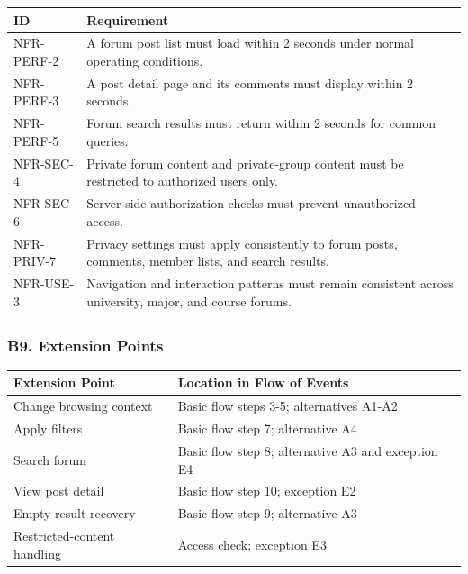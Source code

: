 \documentclass[12pt]{article}
\renewcommand{\baselinestretch}{1.5}
\begin{document}
\begingroup
\small
\renewcommand{\baselinestretch}{1.0}\selectfont
\renewcommand{\arraystretch}{1.15}
\setlength{\tabcolsep}{6pt}
\begin{longtable}{|>{\raggedright\arraybackslash}p{}|>{\raggedright\arraybackslash}p{}|}
\hline
\textbf{ID} & \textbf{Requirement} \\ \hline
\endhead
NFR-PERF-2 & A forum post list must load within 2 seconds under normal operating conditions. \\ \hline
NFR-PERF-3 & A post detail page and its comments must display within 2 seconds. \\ \hline
NFR-PERF-5 & Forum search results must return within 2 seconds for common queries. \\ \hline
NFR-SEC-4 & Private forum content and private-group content must be restricted to authorized users only. \\ \hline
NFR-SEC-6 & Server-side authorization checks must prevent unauthorized access. \\ \hline
NFR-PRIV-7 & Privacy settings must apply consistently to forum posts, comments, member lists, and search results. \\ \hline
NFR-USE-3 & Navigation and interaction patterns must remain consistent across university, major, and course forums. \\ \hline
\end{longtable}
\endgroup
\par\medskip

\hypertarget{sec:b9-extension-points}{}
\subsubsection*{B9. Extension Points}
\par\medskip

\begingroup
\small
\renewcommand{\baselinestretch}{1.0}\selectfont
\renewcommand{\arraystretch}{1.15}
\setlength{\tabcolsep}{6pt}
\begin{longtable}{|>{\raggedright\arraybackslash}p{}|>{\raggedright\arraybackslash}p{}|}
\hline
\textbf{Extension Point} & \textbf{Location in Flow of Events} \\ \hline
\endhead
Change browsing context & Basic flow steps 3-5; alternatives A1-A2 \\ \hline
Apply filters & Basic flow step 7; alternative A4 \\ \hline
Search forum & Basic flow step 8; alternative A3 and exception E4 \\ \hline
View post detail & Basic flow step 10; exception E2 \\ \hline
Empty-result recovery & Basic flow step 9; alternative A3 \\ \hline
Restricted-content handling & Access check; exception E3 \\ \hline
\end{longtable}
\endgroup
\par\medskip
\end{document}
